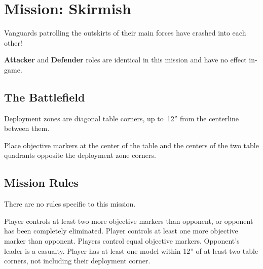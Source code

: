 \clearpage
\section{Mission: Skirmish}

  Vanguards patrolling the outskirts of their main forces have crashed
  into each other!
  \begin{squishitemize}
  \item \textbf{Attacker} and \textbf{Defender} roles are identical in
    this mission and have no effect in-game.
  \end{squishitemize}

\subsection{\bf The Battlefield}%


Deployment zones are diagonal table corners, up to~12'' from the
centerline between them.

Place objective markers at the center of the table and the centers of
the two table quadrants opposite the deployment zone corners.

\subsection{\bf Mission Rules}%

There are no rules specific to this mission.

\vfill
\scoringbox%
{Player controls at least two more objective markers than opponent, or
  opponent has been completely eliminated.}%
{Player controls at least one more objective marker than opponent.}%
{Players control equal objective markers.}%
{Opponent's leader is a casualty.}%
{Player has at least one model within 12'' of at least two table
  corners, not including their deployment corner.}
